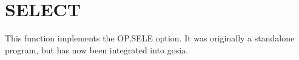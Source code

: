 \section{SELECT}
\label{sect:select}

\noindent This function implements the OP,SELE option. It was originally a
standalone program, but has now been integrated into gosia.\\

